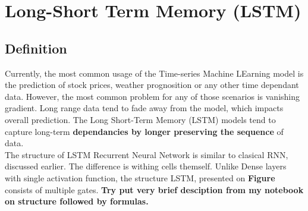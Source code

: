 \section{Long-Short Term Memory (LSTM)}\label{sec:LSTM}
\subsection{Definition}
    Currently, the most common usage of the Time-series Machine LEarning model is the prediction of stock prices, weather prognosition or any other time dependant data.
    However, the most common problem for any of those scenarios is vanishing gradient.
    Long range data tend to fade away from the model, which impacts overall prediction.
    The Long Short-Term Memory (LSTM) models tend to capture long-term \textbf{dependancies by longer preserving the sequence} of data. \\
    The structure of LSTM Recurrent Neural Network is similar to clasical RNN, discussed earlier.
    The difference is withing cells themself.
    Unlike Dense layers with single activation function, the structure LSTM, presented on \textbf{Figure} consists of multiple gates.
    \textbf{Try put very brief desciption from my notebook on structure followed by formulas.} \\ [2 pc]
